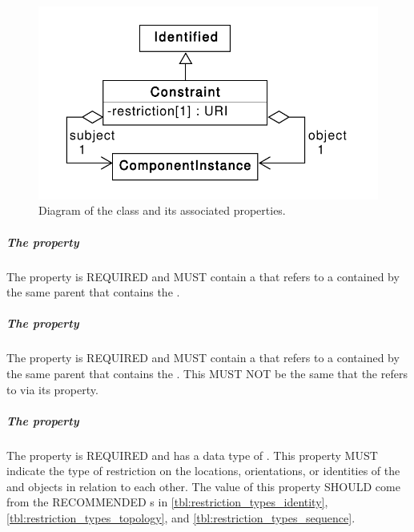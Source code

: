 \begin{figure}[ht]
\begin{center}
\includegraphics[scale=0.6]{uml/constraint}
\caption[]{Diagram of the  class and its associated properties.}
\label{uml:sequence_constraint}
\end{center}
\end{figure}

\subparagraph{The  property}\label{sec:subject}
The  property is REQUIRED and MUST contain a  that refers to a  contained by the same parent  that contains the .

\subparagraph{The  property}\label{sec:object}
The  property is REQUIRED and MUST contain a  that refers to a  contained by the same parent  that contains the . This  MUST NOT be the same  that the  refers to via its  property.

\subparagraph{The  property}\label{sec:restriction}

The  property is REQUIRED and has a data type of . 
This property MUST indicate the type of restriction on the locations, orientations, or identities of the  and   objects in relation to each other. 
The  value of this property SHOULD come from the RECOMMENDED s in \ref{tbl:restriction_types_identity}, \ref{tbl:restriction_types_topology}, and \ref{tbl:restriction_types_sequence}.

